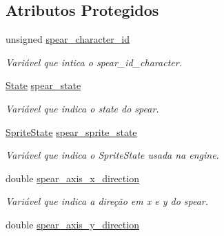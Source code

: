 \subsection*{Atributos Protegidos}
\begin{DoxyCompactItemize}
\item 
\mbox{\label{classSpear_a89f70df449018b3870010c72f9ffaea0}} 
unsigned \mbox{\hyperlink{classSpear_a89f70df449018b3870010c72f9ffaea0}{spear\+\_\+character\+\_\+id}}
\begin{DoxyCompactList}\small\item\em Variável que intica o spear\+\_\+id\+\_\+character. \end{DoxyCompactList}\item 
\mbox{\label{classSpear_ae921f354108401811fcd4cef9a9ee76f}} 
\mbox{\hyperlink{classSpear_a38f3f25555dd7c7891f373fc8479b717}{State}} \mbox{\hyperlink{classSpear_ae921f354108401811fcd4cef9a9ee76f}{spear\+\_\+state}}
\begin{DoxyCompactList}\small\item\em Variável que indica o state do spear. \end{DoxyCompactList}\item 
\mbox{\label{classSpear_a12887ba0f7fddb1d47c26a0efe6b2474}} 
\mbox{\hyperlink{classSpear_a375643d648eb52266f8d0c6f96c0a6b4}{Sprite\+State}} \mbox{\hyperlink{classSpear_a12887ba0f7fddb1d47c26a0efe6b2474}{spear\+\_\+sprite\+\_\+state}}
\begin{DoxyCompactList}\small\item\em Variável que indica o Sprite\+State usada na engine. \end{DoxyCompactList}\item 
\mbox{\label{classSpear_a198f28ef2aabb1a9fc3013de7324070f}} 
double \mbox{\hyperlink{classSpear_a198f28ef2aabb1a9fc3013de7324070f}{spear\+\_\+axis\+\_\+x\+\_\+direction}}
\begin{DoxyCompactList}\small\item\em Variável que indica a direção em x e y do spear. \end{DoxyCompactList}\item 
\mbox{\label{classSpear_af716b055d0d37cdfb57ce1b2f352d712}} 
double \mbox{\hyperlink{classSpear_af716b055d0d37cdfb57ce1b2f352d712}{spear\+\_\+axis\+\_\+y\+\_\+direction}}

\end{DoxyCompactItemize}
